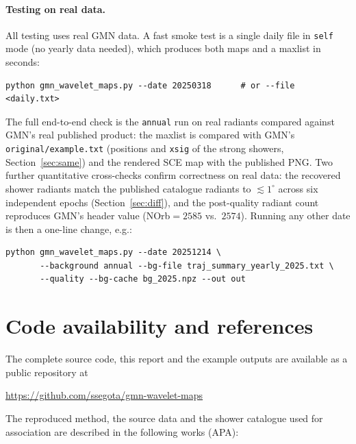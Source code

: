 \documentclass[11pt]{article}
\begin{document}
\paragraph{Testing on real data.} All testing uses real GMN data. A fast smoke
test is a single daily file in \texttt{self} mode (no yearly data needed), which
produces both maps and a maxlist in seconds:
\begin{lstlisting}
python gmn_wavelet_maps.py --date 20250318      # or --file <daily.txt>
\end{lstlisting}
The full end-to-end check is the \texttt{annual} run on real radiants compared
against GMN's real published product: the maxlist is compared with GMN's
\texttt{original/example.txt} (positions and \texttt{xsig} of the strong showers,
Section~\ref{sec:same}) and the rendered SCE map with the published PNG. Two
further quantitative cross-checks confirm correctness on real data: the recovered
shower radiants match the published catalogue radiants to $\lesssim 1^\circ$
across six independent epochs (Section~\ref{sec:diff}), and the post-quality
radiant count reproduces GMN's header value (NOrb${}=2585$ vs.\ $2574$). Running
any other date is then a one-line change, e.g.:
\begin{lstlisting}
python gmn_wavelet_maps.py --date 20251214 \
       --background annual --bg-file traj_summary_yearly_2025.txt \
       --quality --bg-cache bg_2025.npz --out out
\end{lstlisting}

\section{Code availability and references}
\label{sec:refs}

The complete source code, this report and the example outputs are available as a
public repository at\\[2pt]
\centerline{\url{https://github.com/ssegota/gmn-wavelet-maps}}

\medskip
\noindent The reproduced method, the source data and the shower catalogue used
for association are described in the following works (APA):
\end{document}
